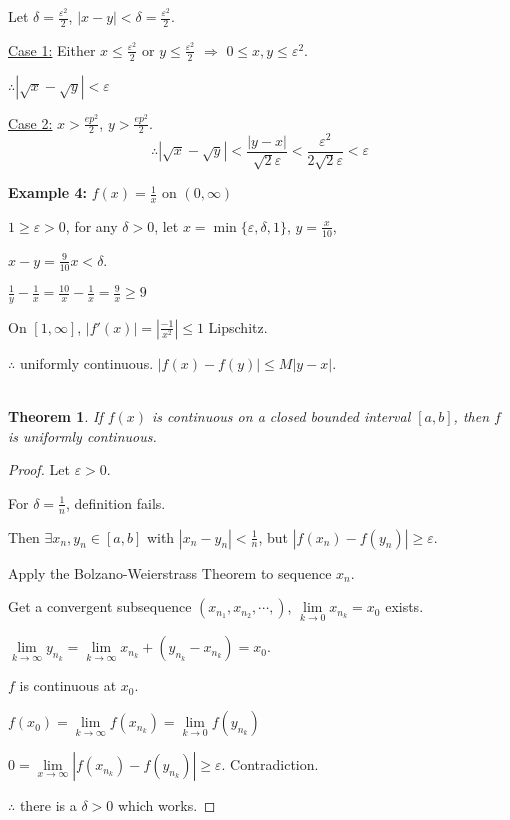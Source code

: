\documentclass[12pt]{article}
\newcommand{\abs}[1]{\left| #1 \right|}
\theoremstyle{plain}
\newtheorem{theorem}{Theorem}[subsection]
\newcommand{\ep}{\varepsilon}
\newcommand{\dlim}{\displaystyle\lim\limits}
\begin{document}
{	Let $\delta = \frac{\ep^2}{2}$, $\abs{x-y}<\delta = \frac{\ep^2}2$.

	\underline{Case 1:} Either $x\leq \frac{\ep^2}2$ or $y\leq \frac{\ep^2}2$
	$\Rightarrow$ $0\leq x, y\leq \ep^2$. 
	
	$\therefore \abs{\sqrt x-\sqrt y}<\ep$

	\underline{Case 2:} $x > \frac{ep^2}2$, $y>\frac{ep^2}2$. 
	\[
		\therefore \abs{\sqrt x- \sqrt y} < \frac{\abs{y-x}}{\sqrt 2 \ep} 
		<\frac{\ep^2}{2\sqrt 2\ep}<\ep
	\]

	\textbf{Example 4:} $f(x) = \frac 1x$ on $(0, \infty)$ 

	$1\geq\ep>0$, for any $\delta>0$, 
	let $x=\min \{\ep, \delta, 1\}$, $y= \frac x{10}$, 

	$x-y = \frac 9{10} x < \delta$.  

	$\frac1y-\frac 1x = \frac{10}x -\frac1x=\frac 9x \geq 9$

	On $[1,\infty]$, $\abs{f'(x)} = \abs{\frac{-1}{x^2}}\leq 1$ 
	Lipschitz.

	$\therefore$ uniformly continuous. 
	$\abs{f(x)-f(y)}\leq M\abs{y-x}$.\\\\
	}

	\begin{theorem}
		If $f(x)$ is continuous on a closed bounded interval $[a,b]$, then $f$ is 
		uniformly continuous.
	\end{theorem}
	\begin{proof}
		Let $\ep>0$. 
		
		For $\delta = \frac 1n$, definition fails.

		Then $\exists x_n, y_n \in [a,b]$ with $\abs{x_n-y_n} < \frac1n$, 
		but $\abs{f(x_n)-f(y_n)}\geq \ep$. 

		Apply the Bolzano-Weierstrass Theorem to sequence $x_n$.\

		Get a convergent subsequence $(x_{n_1}, x_{n_2},\cdots,)$, 
		$\dlim_{k\to 0} x_{n_k} = x_0$ exists.

		$\dlim_{k\to \infty} y_{n_k} 
		= \dlim_{k\to\infty} x_{n_k}+(y_{n_k}-x_{n_k}) = x_0$.

		$f$ is continuous at $x_0$. 
		
		$f(x_0) = \dlim_{k\to\infty} f(x_{n_k}) = \dlim_{k\to 0} f(y_{n_k})$

		$0= \dlim_{x\to \infty} \abs{f(x_{n_k})-f(y_{n_k})} \geq \ep$. 
		Contradiction.
		
		$\therefore$ there is a $\delta > 0$ which works. 
	\end{proof}
	
\end{document}
